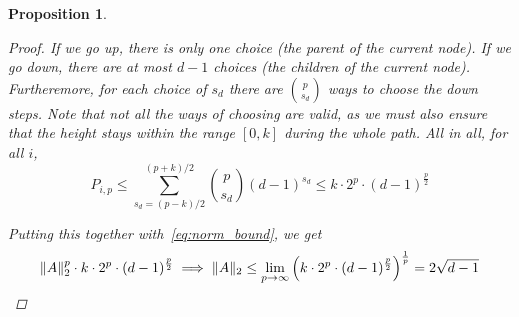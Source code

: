 \documentclass{amsart}
\theoremstyle{plain}
\newtheorem*{proposition}{\textbf{Proposition}}
\theoremstyle{definition}
\DeclarePairedDelimiter{\norm}{\lVert}{\rVert}
\begin{document}
\begin{proposition}
\begin{proof}
            If we go \emph{up}, there is only one choice (the parent of the current node).
            If we go \emph{down}, there are at most $d-1$ choices (the children of the current node).
            Furtheremore, for each choice of $s_d$ there are $\binom{p}{s_d}$ ways to choose the \emph{down} steps.
            Note that not all the ways of choosing are valid, as we must also ensure that the
            height stays within the range $[0, k]$ during the whole path.
            All in all, for all $i$,
            \begin{equation*}
                P_{i,p}
                \leq
                \sum_{s_d = (p-k)/2}^{(p+k)/2} \binom{p}{s_d} (d-1)^{s_d}
                \leq
                k \cdot 2^p \cdot (d-1)^{\frac{p}{2}}
            \end{equation*}

            Putting this together with~\eqref{eq:norm_bound}, we get
            \begin{equation*}
                \norm{A}_2^p \cdot k \cdot 2^p \cdot (d-1)^{\frac{p}{2}} \implies
                \norm{A}_2 \leq \lim_{p \to \infty}
                \left(k \cdot 2^p \cdot (d-1)^{\frac{p}{2}}\right)^{\frac{1}{p}} = 2 \sqrt{d-1}
            \end{equation*}
        \end{proof}
    \end{proposition}
\end{document}
